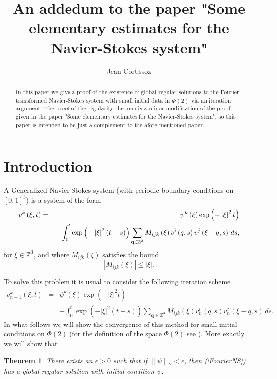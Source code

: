 \documentclass{amsart}
\title[Fixed Point]{An addedum to the paper "Some elementary estimates for the Navier-Stokes system"}
\author{Jean Cortissoz}
\newtheorem{theorem}{Theorem}
\begin{document}
\begin{abstract}
In this paper we give a proof of the existence of global
regular solutions to the Fourier transformed Navier-Stokes system
with small initial data in $\Phi\left(2\right)$ via an iteration argument.
The proof of the regularity theorem is a minor modification of the proof given in the paper 
"Some elementary estimates for the Navier-Stokes system", so this paper is intended to
be just a complement to the afore mentioned paper.
\end{abstract}
\maketitle

\section{Introduction}

A Generalized Navier-Stokes system (with periodic boundary conditions
on $\left[0,1\right]^3$) is a system of the form
\begin{eqnarray}
\label{FourierNS}
v^k\left(\xi,t\right)&=&
\psi^k\left(\xi\right)\exp\left(-\left|\xi\right|^2 t\right)\\ \notag
&&
+\int_{0}^t\exp\left(-\left|\xi\right|^2\left(t-s\right)\right)\sum_{\mathbf{q}\in\mathbb{Z}^3}
M_{ijk}\left(\xi\right)v^i\left(q,s\right)v^j\left(\xi-q,s\right)\, ds,
\end{eqnarray}
for $\xi\in \mathbb{Z}^3$, and where $M_{ijk}\left(\xi\right)$ satisfies the bound 
\[
\left|M_{ijk}\left(\xi\right)\right|\leq \left|\xi\right|.
\]

To solve this problem it is usual to consider the following iteration scheme
\begin{eqnarray*}
v_{n+1}^k\left(\xi,t\right)&=&
\psi^k\left(\xi\right)\exp\left(-\left|\xi\right|^2 t\right)\\
&&
+\int_{0}^t\exp\left(-\left|\xi\right|^2\left(t-s\right)\right)\sum_{\mathbf{q}\in\mathbb{Z}^3}
M_{ijk}\left(\xi\right)v_n^i\left(q,s\right)v_n^j\left(\xi-q,s\right)\, ds.
\end{eqnarray*}
In what follows we will show the convergence of this method for small initial conditions on 
$\Phi\left(2\right)$ (for the definition of the space $\Phi\left(2\right)$ see \cite{Cortissoz}).
More exactly we will show that
\begin{theorem}
There exists an $\epsilon>0$ such that if $\left\|\psi\right\|_2<\epsilon$, then
(\ref{FourierNS}) has a global regular solution with initial condition $\psi$.
\end{theorem}
\end{document}
